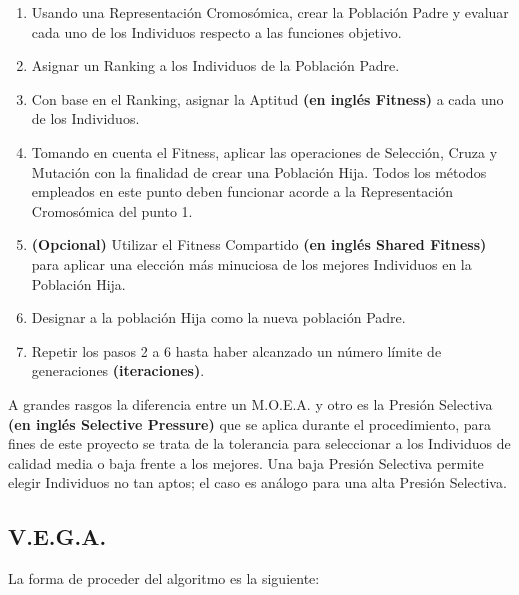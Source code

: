 \documentclass[class=report, crop=false]{standalone}
\begin{document}
\begin{enumerate}[1.]
\item Usando una Representación Cromosómica, crear la Población Padre y evaluar cada uno de los Individuos respecto a las funciones objetivo.

\item Asignar un Ranking a los Individuos de la Población Padre.  

\item Con base en el Ranking, asignar la Aptitud \textbf{(en inglés Fitness)} a cada uno de los Individuos.

\item Tomando en cuenta el Fitness, aplicar las operaciones de Selección, Cruza y Mutación con la finalidad de crear una Población Hija. Todos los métodos empleados en este punto deben funcionar acorde a la Representación Cromosómica del punto 1.

\item \textbf{(Opcional)} Utilizar el Fitness Compartido \textbf{(en inglés Shared Fitness)} para aplicar una elección más minuciosa de los mejores Individuos en la Población Hija. 

\item Designar a la población Hija como la nueva población Padre.

\item Repetir los pasos 2 a 6 hasta haber alcanzado un número límite de generaciones \textbf{(iteraciones)}. 
\end{enumerate}

A grandes rasgos la diferencia entre un M.O.E.A. y otro es la Presión Selectiva 
\textbf{(en inglés Selective Pressure)} que se aplica durante el procedimiento, para fines de este proyecto
se trata de la tolerancia para seleccionar a los Individuos de calidad media o baja frente a los
mejores. Una baja Presión Selectiva permite elegir Individuos no tan aptos; el caso es análogo para
una alta Presión Selectiva.



\subsection{V.E.G.A.}
La forma de proceder del algoritmo es la siguiente:
\end{document}
